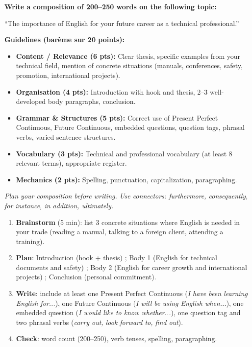 \documentclass[11pt]{article}
\begin{document}
\begin{exercice}
\textbf{Write a composition of 200--250 words on the following topic:}

``The importance of English for your future career as a technical professional.''

\textbf{Guidelines (barème sur 20 points):}
\begin{itemize}
    \item \textbf{Content / Relevance (6 pts):} Clear thesis, specific examples from your technical field, mention of concrete situations (manuals, conferences, safety, promotion, international projects).
    \item \textbf{Organisation (4 pts):} Introduction with hook and thesis, 2--3 well-developed body paragraphs, conclusion.
    \item \textbf{Grammar \& Structures (5 pts):} Correct use of Present Perfect Continuous, Future Continuous, embedded questions, question tags, phrasal verbs, varied sentence structures.
    \item \textbf{Vocabulary (3 pts):} Technical and professional vocabulary (at least 8 relevant terms), appropriate register.
    \item \textbf{Mechanics (2 pts):} Spelling, punctuation, capitalization, paragraphing.
\end{itemize}
\textit{Plan your composition before writing. Use connectors: furthermore, consequently, for instance, in addition, ultimately.}
\end{exercice}

\begin{methode}
\begin{enumerate}
    \item \textbf{Brainstorm} (5 min): list 3 concrete situations where English is needed in your trade (reading a manual, talking to a foreign client, attending a training).
    \item \textbf{Plan}: Introduction (hook + thesis) ; Body 1 (English for technical documents and safety) ; Body 2 (English for career growth and international projects) ; Conclusion (personal commitment).
    \item \textbf{Write}: include at least one Present Perfect Continuous (\emph{I have been learning English for...}), one Future Continuous (\emph{I will be using English when...}), one embedded question (\emph{I would like to know whether...}), one question tag and two phrasal verbs (\emph{carry out, look forward to, find out}).
    \item \textbf{Check}: word count (200--250), verb tenses, spelling, paragraphing.
\end{enumerate}
\end{methode}
\end{document}
